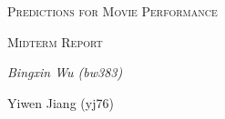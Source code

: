 \documentclass[12pt]{article}
\begin{document}
\begin{titlepage}
    \vspace*{5.7cm}
    \begin{center}
    {\scshape\huge Predictions for Movie Performance \par}
    \vspace{1cm}
    {\scshape\huge Midterm Report \par}
    \vspace{1.5cm}
    {\itshape\large Bingxin Wu (bw383) \par \bigskip Yiwen Jiang (yj76) }
    \vspace{1cm}

    \end{center}
\end{titlepage}

\clearpage
\setcounter{page}{1}
\end{document}

